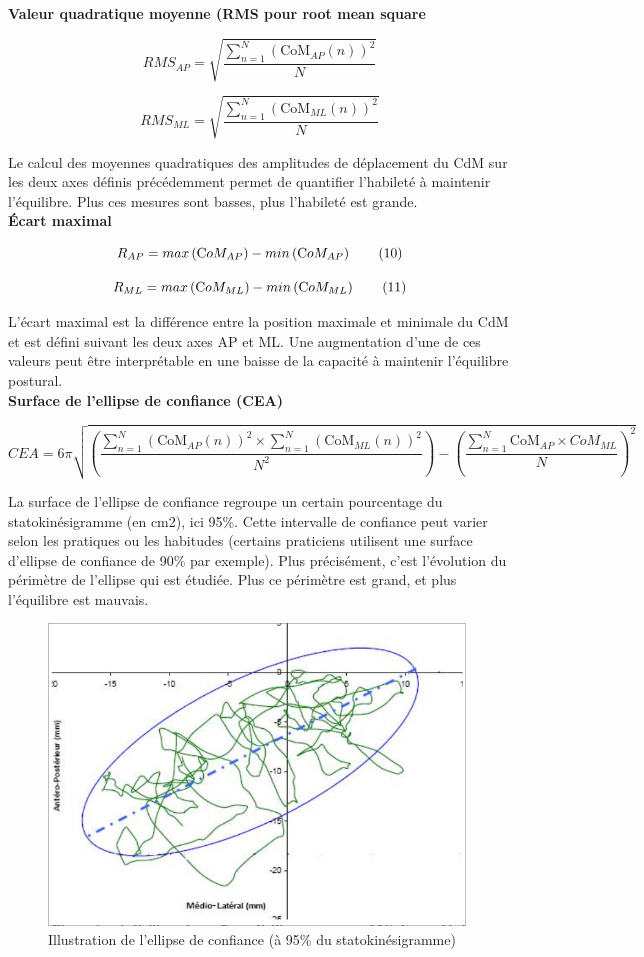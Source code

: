\textbf{Valeur quadratique moyenne (RMS pour root mean square}


\[
RMS_{AP} =\sqrt{  \frac{\sum_{n=1}^{N} \left (\text{CoM}_{AP}(n) \right)^2 }{N}}  \tag{8}
\]

\[
RMS_{ML} =\sqrt{  \frac{\sum_{n=1}^{N} \left (\text{CoM}_{ML}(n) \right)^2 }{N}}  \tag{9}
\]

Le calcul des moyennes quadratiques des amplitudes de déplacement du CdM sur les deux axes définis précédemment permet de quantifier l'habileté à maintenir l'équilibre. 
Plus ces mesures sont basses, plus l'habileté est grande.\\

\textbf{Écart maximal}


\[
R_{AP}= max \left ( \text CoM_{AP} \right ) - min\left ( \text CoM_{AP} \right ) \tag{10}
\]


\[R_{ML}= max \left ( \text CoM_{ML} \right ) - min\left ( \text CoM_{ML} \right ) \tag{11}
\]

L'écart maximal est la différence entre la position maximale et minimale du CdM et est défini suivant les deux axes AP et ML. 
Une augmentation d'une de ces valeurs peut être interprétable en une baisse de la capacité à maintenir l'équilibre postural.\\

\textbf{Surface de l'ellipse de confiance (CEA)}

\[
CEA= 6\pi \sqrt{ \left ( \frac{\sum_{n=1}^{N} \left (\text{CoM}_{AP}(n) \right)^2 \times \sum_{n=1}^{N} \left ( \text{CoM}_{ML}(n) \right)^2}{N^2} \right ) - \left (\frac{\sum_{n=1}^N \text{CoM}_{AP} \times CoM_{ML}}{N} \right)^2} \tag{12}
\]

La surface de l'ellipse de confiance regroupe un certain pourcentage du statokinésigramme (en cm2), ici 95\%. 
Cette intervalle de confiance peut varier selon les pratiques ou les habitudes (certains praticiens utilisent une surface d'ellipse de confiance de 90\% par exemple). 
Plus précisément, c'est l'évolution du périmètre de l'ellipse qui est étudiée. 
Plus ce périmètre est grand, et plus l'équilibre est mauvais.

\begin{figure}[H]
    \centering
    \includegraphics[height=8cm]{images/methode/ellipse_confiance_95.png}
    \caption{Illustration de l'ellipse de confiance (à 95\% du statokinésigramme)}\label{fig:ellipse_confiance}
\end{figure}

